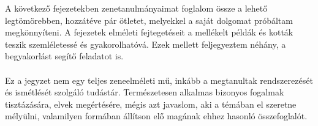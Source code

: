 A következő fejezetekben zenetanulmányaimat foglalom össze a lehető legtömörebben, hozzátéve pár ötletet, 
melyekkel a saját dolgomat próbáltam megkönnyíteni. A fejezetek elméleti fejtegetéseit a mellékelt példák 
és kották teszik szemléletessé és gyakorolhatóvá. 
Ezek mellett feljegyeztem néhány, a begyakorlást segítő feladatot is. \\\\
Ez a jegyzet nem egy teljes zeneelméleti mű, inkább a megtanultak rendszerezését és ismétlését szolgáló tudástár. 
Természetesen alkalmas bizonyos fogalmak tisztázására, elvek megértésére, mégis azt javaslom, 
aki a témában el szeretne mélyülni, valamilyen formában állítson elő magának ehhez hasonló összefoglalót.
